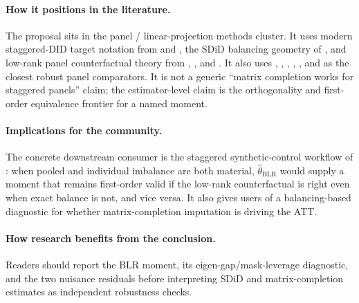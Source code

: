 \documentclass[11pt]{article}
\theoremstyle{definition}
\theoremstyle{plain}
\theoremstyle{remark}
\begin{document}
\paragraph{How it positions in the literature.}
The proposal sits in the panel / linear-projection methods cluster. It uses
modern staggered-DID target notation from \citet{CallawaySantAnna2021} and
\citet{BorusyakJaravelSpiess2024}, the SDiD balancing geometry of
\citet{ArkhangelskyAtheyHirshbergImbensWager2021}, and low-rank panel
counterfactual theory from \citet{AtheyBayatiDoudchenkoImbensKhosravi2021},
\citet{BaiNg2021}, and \citet{ChoiKwonLiao2024}. It also uses
\citet{ArkhangelskyImbens2022}, \citet{ArkhangelskyImbensLeiLuo2024},
\citet{AbadieAgarwalDwivediShah2024},
\citet{QiuShiMiaoDobribanTchetgenTchetgen2024},
\citet{AgarwalDahlehShahShen2023}, and
\citet{AtheyImbensQuViviano2025} as the closest robust panel comparators. It is not a generic
``matrix completion works for staggered panels'' claim; the estimator-level
claim is the orthogonality and first-order equivalence frontier for a named
moment.

\paragraph{Implications for the community.}
The concrete downstream consumer is the staggered synthetic-control workflow
of \citet{BenMichaelFellerRothstein2022}: when pooled and individual
imbalance are both material, $\widehat\theta_{\mathrm{BLR}}$ would supply a
moment that remains first-order valid if the low-rank counterfactual is right
even when exact balance is not, and vice versa. It also gives users of
\citet{AtheyBayatiDoudchenkoImbensKhosravi2021} a balancing-based diagnostic
for whether matrix-completion imputation is driving the ATT.

\paragraph{How research benefits from the conclusion.}
Readers should report the BLR moment, its eigen-gap/mask-leverage diagnostic,
and the two nuisance residuals before interpreting SDiD and matrix-completion
estimates as independent robustness checks.
\end{document}
